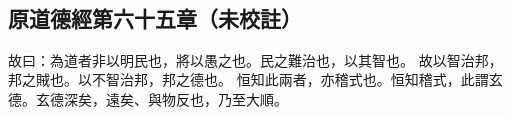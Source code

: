 ﻿%
%

\chapter{~}

\section{原道德經第六十五章（未校註）}

\begin{withgezhu}

\zhsong


故曰：為道者非以明民也，將以愚之也。民之難治也，\textcolor{tongjia-color}{以其智也}。
\textcolor{tongjia-color}{故以智治邦，邦之賊也}。以不智治邦，邦之德也。
恒知此兩者，亦稽式也。恒知稽式，此謂玄德。玄德深矣，遠矣、與物反也，乃至大順。

\end{withgezhu}
